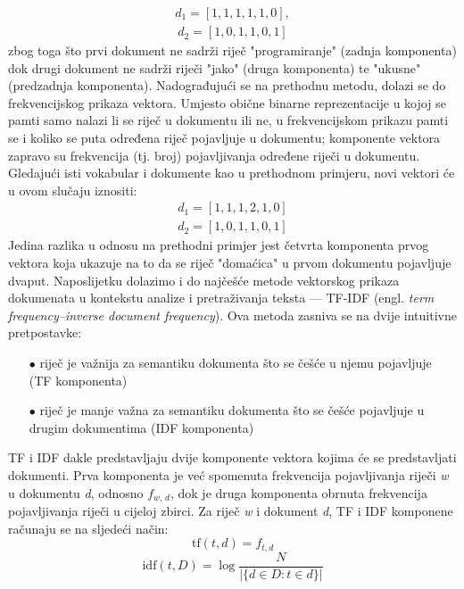 \documentclass[times, utf8, zavrsni]{fer}
\begin{document}
\begin{align*}
{{d_{1}}=[1, 1, 1, 1, 1, 0]},
\end{align*}
\begin{align*}
{{d_{2}}=[1, 0, 1, 1, 0, 1]}
\end{align*}
zbog toga što prvi dokument ne sadrži riječ "programiranje" (zadnja komponenta) dok drugi dokument ne sadrži riječi "jako" (druga komponenta) te "ukusne" (predzadnja komponenta).
Nadograđujući se na prethodnu metodu, dolazi se do frekvencijskog prikaza vektora. Umjesto obične binarne reprezentacije u kojoj se pamti samo nalazi li se riječ u dokumentu ili ne, u frekvencijskom prikazu pamti se i koliko se puta određena riječ pojavljuje u dokumentu; komponente vektora zapravo su frekvencija (tj. broj) pojavljivanja određene riječi u dokumentu. Gledajući isti vokabular i dokumente kao u prethodnom primjeru, novi vektori će u ovom slučaju iznositi:
\begin{align*}
{{d_{1}}=[1, 1, 1, 2, 1, 0]}
\end{align*}
\begin{align*}
{{d_{2}}=[1, 0, 1, 1, 0, 1]}
\end{align*}
Jedina razlika u odnosu na prethodni primjer jest četvrta komponenta prvog vektora koja ukazuje na to da se riječ "domaćica" u prvom dokumentu pojavljuje dvaput.
Naposlijetku dolazimo i do najčešće metode vektorskog prikaza dokumenata u kontekstu analize i pretraživanja teksta — TF-IDF (engl. \textit{term frequency–inverse document frequency}). Ova metoda zasniva se na dvije intuitivne pretpostavke:
\begin{itemize}
\item[$\bullet$] riječ je važnija za semantiku dokumenta što se češće u njemu pojavljuje (TF komponenta)
\item[$\bullet$] riječ je manje važna za semantiku dokumenta što se češće pojavljuje u drugim dokumentima (IDF komponenta)
\end{itemize}
TF i IDF dakle predstavljaju dvije komponente vektora kojima će se predstavljati dokumenti. Prva komponenta je već spomenuta frekvencija pojavljivanja riječi \textit{w} u dokumentu \textit{d}, odnosno $f_\textit{w, d}$, dok je druga komponenta obrnuta frekvencija pojavljivanja riječi u cijeloj zbirci.
Za riječ \textit{w} i dokument \textit{d}, TF i IDF komponene računaju se na sljedeći način:
\begin{equation}
{\displaystyle \mathrm {tf} (t,d)=f_{t,d}}
\end{equation}
\begin{equation}
{\displaystyle \mathrm {idf} (t,D)=\log {\frac {N}{|\{d\in D:t\in d\}|}}}
\label{eq:idf}
\end{equation}
\end{document}
